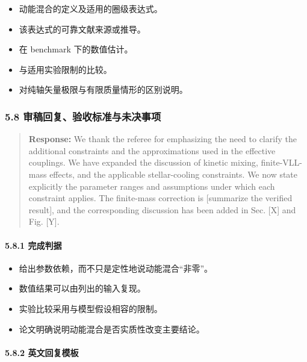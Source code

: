 \documentclass[
]{article}
\providecommand{\tightlist}{%
  \setlength{\itemsep}{0pt}\setlength{\parskip}{0pt}}
\begin{document}
\begin{itemize}
\tightlist
\item
  动能混合的定义及适用的圈级表达式。
\item
  该表达式的可靠文献来源或推导。
\item
  在 benchmark 下的数值估计。
\item
  与适用实验限制的比较。
\item
  对纯轴矢量极限与有限质量情形的区别说明。
\end{itemize}

\subsubsection{5.8
审稿回复、验收标准与未决事项}\label{ux5ba1ux7a3fux56deux590dux9a8cux6536ux6807ux51c6ux4e0eux672aux51b3ux4e8bux9879-3}

\begin{quote}
\textbf{Response:} We thank the referee for emphasizing the need to
clarify the additional constraints and the approximations used in the
effective couplings. We have expanded the discussion of kinetic mixing,
finite-VLL-mass effects, and the applicable stellar-cooling constraints.
We now state explicitly the parameter ranges and assumptions under which
each constraint applies. The finite-mass correction is {[}summarize the
verified result{]}, and the corresponding discussion has been added in
Sec. {[}X{]} and Fig. {[}Y{]}.
\end{quote}

\paragraph{5.8.1 完成判据}\label{ux5b8cux6210ux5224ux636e-1}

\begin{itemize}
\tightlist
\item
  给出参数依赖，而不只是定性地说动能混合``非零''。
\item
  数值结果可以由列出的输入复现。
\item
  实验比较采用与模型假设相容的限制。
\item
  论文明确说明动能混合是否实质性改变主要结论。
\end{itemize}

\paragraph{5.8.2
英文回复模板}\label{ux82f1ux6587ux56deux590dux6a21ux677f-1}
\end{document}
